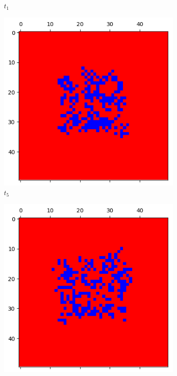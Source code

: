 \documentclass[letterpaper]{article}
\begin{document}
\begin{figure}[H]
\begin{subfigure}{.33\textwidth}
      \caption{$t_{1}$}
    \end{subfigure}
    \begin{subfigure}{.33\textwidth}
      \centering
      \includegraphics[width=1\linewidth]{images/assign2/part32-defect/t5}
      \caption{$t_{5}$}
    \end{subfigure}
    \begin{subfigure}{.33\textwidth}
      \centering
      \includegraphics[width=1\linewidth]{images/assign2/part32-defect/t10}

\end{subfigure}
\end{figure}
\end{document}
